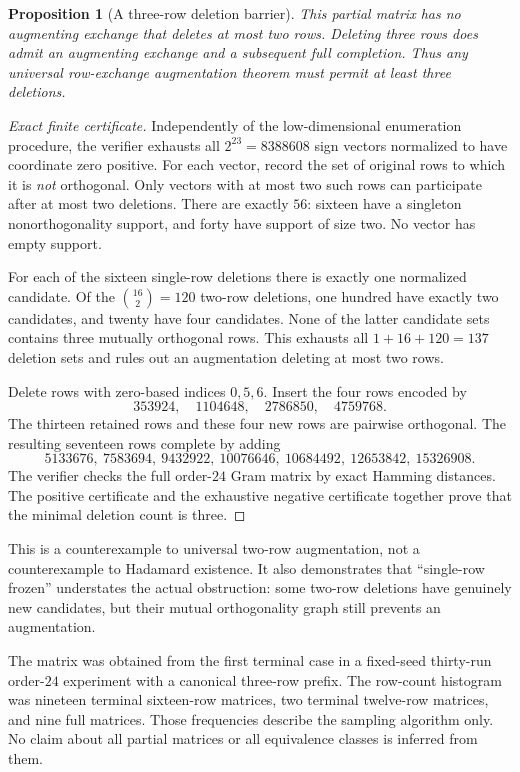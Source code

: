 \documentclass[11pt]{article}
\newtheorem{proposition}{Proposition}[section]
\begin{document}
\begin{proposition}[A three-row deletion barrier]
This partial matrix has no augmenting exchange that deletes at most
two rows. Deleting three rows does admit an augmenting exchange and
a subsequent full completion. Thus any universal row-exchange
augmentation theorem must permit at least three deletions.
\end{proposition}
\begin{proof}[Exact finite certificate]
Independently of the low-dimensional enumeration procedure, the
verifier exhausts all $2^{23}=8388608$ sign vectors normalized to have
coordinate zero positive. For each vector, record the set of original
rows to which it is \emph{not} orthogonal. Only vectors with at most
two such rows can participate after at most two deletions. There are
exactly $56$: sixteen have a singleton nonorthogonality support, and
forty have support of size two. No vector has empty support.

For each of the sixteen single-row deletions there is exactly one
normalized candidate. Of the $\binom{16}{2}=120$ two-row deletions,
one hundred have exactly two candidates, and twenty have four
candidates. None of the latter candidate sets contains three mutually
orthogonal rows. This exhausts all $1+16+120=137$ deletion sets and
rules out an augmentation deleting at most two rows.

Delete rows with zero-based indices $0,5,6$. Insert the four rows
encoded by
\[
 353924,\quad1104648,\quad2786850,\quad4759768.
\]
The thirteen retained rows and these four new rows are pairwise
orthogonal. The resulting seventeen rows complete by adding
\[
 5133676,\ 7583694,\ 9432922,\ 10076646,\ 10684492,\ 12653842,\ 15326908.
\]
The verifier checks the full order-$24$ Gram matrix by exact Hamming
distances. The positive certificate and the exhaustive negative
certificate together prove that the minimal deletion count is three.
\end{proof}

This is a counterexample to universal two-row augmentation, not a
counterexample to Hadamard existence. It also demonstrates that
``single-row frozen'' understates the actual obstruction: some
two-row deletions have genuinely new candidates, but their mutual
orthogonality graph still prevents an augmentation.

The matrix was obtained from the first terminal case in a fixed-seed
thirty-run order-$24$ experiment with a canonical three-row prefix.
The row-count histogram was nineteen terminal sixteen-row matrices,
two terminal twelve-row matrices, and nine full matrices. Those
frequencies describe the sampling algorithm only. No claim about all
partial matrices or all equivalence classes is inferred from them.
\end{document}
